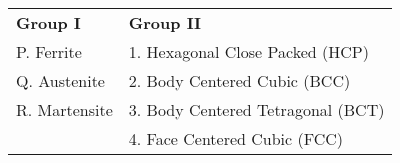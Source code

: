 \begin{center}
\begin{tabular}{ll}
    \textbf{Group I} & \textbf{Group II} \\
    P. Ferrite & 1. Hexagonal Close Packed (HCP) \\
    Q. Austenite & 2. Body Centered Cubic (BCC) \\
    R. Martensite & 3. Body Centered Tetragonal (BCT) \\
    & 4. Face Centered Cubic (FCC)
\end{tabular}
\end{center}